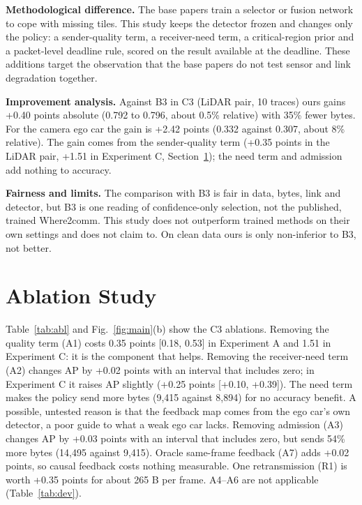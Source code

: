\documentclass[conference]{IEEEtran}
\begin{document}
\textbf{Methodological difference.} The base papers train a selector or fusion network to cope with missing tiles. This study keeps the detector frozen and changes only the policy: a sender-quality term, a receiver-need term, a critical-region prior and a packet-level deadline rule, scored on the result available at the deadline. These additions target the observation that the base papers do not test sensor and link degradation together.

\textbf{Improvement analysis.} Against B3 in C3 (LiDAR pair, 10 traces) ours gains +0.40 points absolute (0.792 to 0.796, about 0.5\% relative) with 35\% fewer bytes. For the camera ego car the gain is +2.42 points (0.332 against 0.307, about 8\% relative). The gain comes from the sender-quality term (+0.35 points in the LiDAR pair, +1.51 in Experiment C, Section~\ref{sec:ablation}); the need term and admission add nothing to accuracy.

\textbf{Fairness and limits.} The comparison with B3 is fair in data, bytes, link and detector, but B3 is one reading of confidence-only selection, not the published, trained Where2comm. This study does not outperform trained methods on their own settings and does not claim to. On clean data ours is only non-inferior to B3, not better.

\section{Ablation Study}\label{sec:ablation}
Table~\ref{tab:abl} and Fig.~\ref{fig:main}(b) show the C3 ablations. Removing the quality term (A1) costs 0.35 points [0.18, 0.53] in Experiment A and 1.51 in Experiment C: it is the component that helps. Removing the receiver-need term (A2) changes AP by +0.02 points with an interval that includes zero; in Experiment C it raises AP slightly (+0.25 points [+0.10, +0.39]). The need term makes the policy send more bytes (9,415 against 8,894) for no accuracy benefit. A possible, untested reason is that the feedback map comes from the ego car's own detector, a poor guide to what a weak ego car lacks. Removing admission (A3) changes AP by +0.03 points with an interval that includes zero, but sends 54\% more bytes (14,495 against 9,415). Oracle same-frame feedback (A7) adds +0.02 points, so causal feedback costs nothing measurable. One retransmission (R1) is worth +0.35 points for about 265 B per frame. A4--A6 are not applicable (Table~\ref{tab:dev}).


\end{document}
